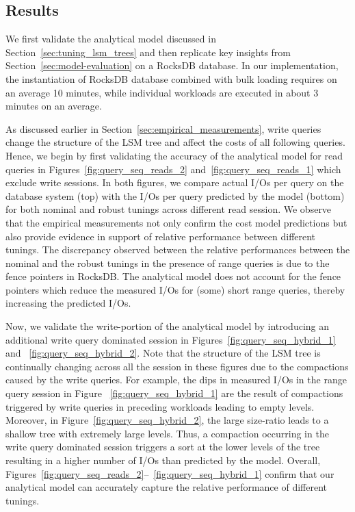 \subsection{Results}
\label{sec:system-results}

We first validate the analytical model discussed in
    Section~\ref{sec:tuning_lsm_trees} and then
    replicate key insights from Section~\ref{sec:model-evaluation} on a 
    RocksDB database.
In our implementation, the instantiation of RocksDB database combined with bulk loading
    requires on an average 10 minutes, while individual workloads are executed
    in about 3 minutes on an average.

As discussed earlier in Section~\ref{sec:empirical_measurements}, write queries
    change the structure of the LSM tree and affect the costs of all following
    queries.
Hence, we begin by first validating the accuracy of the analytical model for read queries in
    Figures~\ref{fig:query_seq_reads_2} and~\ref{fig:query_seq_reads_1}
    which exclude write sessions.
In both figures, we compare actual I/Os per query on the database system (top)
    with the I/Os per query predicted by the model (bottom) for both nominal and 
    robust tunings across different read session.
We observe that the empirical measurements not only confirm the cost model 
    predictions but also provide evidence in support of relative performance
    between different tunings.
The discrepancy observed between the relative performances between the nominal
    and the robust tunings in the presence of range queries is due to the fence pointers in RocksDB.
The analytical model does not account for the fence pointers which reduce the 
    measured I/Os for (some) short range queries, thereby increasing the predicted I/Os. 

Now, we validate the write-portion of the analytical model by introducing an additional write 
    query dominated session in Figures~\ref{fig:query_seq_hybrid_1} and 
    ~\ref{fig:query_seq_hybrid_2}.
Note that the structure of the LSM tree is continually changing across all the
    session in these figures due to the compactions caused by the write queries.
For example, the dips in measured I/Os in the range query session in Figure
    ~\ref{fig:query_seq_hybrid_1} are the result of compactions triggered
    by write queries in preceding workloads leading to empty levels.
Moreover, in Figure~\ref{fig:query_seq_hybrid_2}, the large size-ratio {\sizeratio}
    leads to a shallow tree with extremely large levels. 
Thus, a compaction occurring in the write query dominated session triggers a sort
    at the lower levels of the tree resulting in a higher number of I/Os than
    predicted by the model. 
Overall, Figures~\ref{fig:query_seq_reads_2}--~\ref{fig:query_seq_hybrid_1} confirm
    that our analytical model can accurately capture the relative 
    performance of different tunings.

